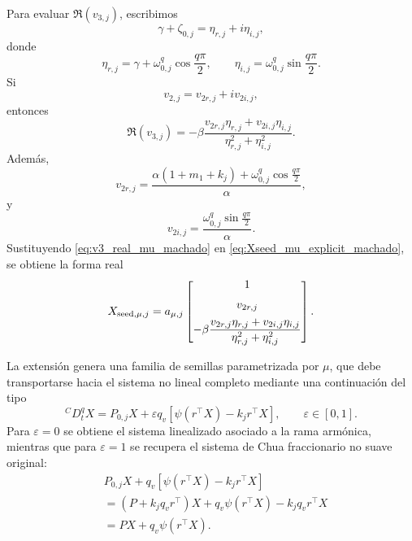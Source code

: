 \documentclass[journal]{IEEEtran}
\begin{document}
Para evaluar \(\Re(v_{3,j})\), escribimos
\begin{equation}
\label{eq:eta_mu_machado}
\gamma+\zeta_{0,j}
=
\eta_{r,j}+i\eta_{i,j},
\end{equation}
donde
\begin{equation}
\eta_{r,j}
=
\gamma+\omega_{0,j}^q\cos\frac{q\pi}{2},
\qquad
\eta_{i,j}
=
\omega_{0,j}^q\sin\frac{q\pi}{2}.
\end{equation}
Si
\[
v_{2,j}=v_{2r,j}+iv_{2i,j},
\]
entonces
\begin{equation}
\label{eq:v3_real_mu_machado}
\Re(v_{3,j})
=
-\beta
\frac{
v_{2r,j}\eta_{r,j}+v_{2i,j}\eta_{i,j}
}{
\eta_{r,j}^2+\eta_{i,j}^2
}.
\end{equation}
Además,
\begin{equation}
\label{eq:v2r_mu_machado}
v_{2r,j}
=
\frac{
\alpha(1+m_1+k_j)+
\omega_{0,j}^q\cos\frac{q\pi}{2}
}{\alpha},
\end{equation}
y
\begin{equation}
\label{eq:v2i_mu_machado}
v_{2i,j}
=
\frac{
\omega_{0,j}^q\sin\frac{q\pi}{2}
}{\alpha}.
\end{equation}
Sustituyendo \eqref{eq:v3_real_mu_machado} en
\eqref{eq:Xseed_mu_explicit_machado}, se obtiene la forma real
\begin{equation}
\label{eq:Xseed_mu_final_machado}
X_{{\rm seed},\mu,j}
=
a_{\mu,j}
\begin{bmatrix}
1\\[2mm]
v_{2r,j}\\[2mm]
-\beta
\dfrac{
v_{2r,j}\eta_{r,j}+v_{2i,j}\eta_{i,j}
}{
\eta_{r,j}^2+\eta_{i,j}^2
}
\end{bmatrix}.
\end{equation}


La extensión genera una
familia de semillas parametrizada por \(\mu\), que debe transportarse hacia
el sistema no lineal completo mediante una continuación del tipo
\begin{equation}
\label{eq:continuation_mu_machado}
{}^CD_t^qX
=
P_{0,j}X
+
\varepsilon q_v
\left[
\psi(r^\top X)-k_jr^\top X
\right],
\qquad
\varepsilon\in[0,1].
\end{equation}
Para \(\varepsilon=0\) se obtiene el sistema linealizado asociado a la rama
armónica, mientras que para \(\varepsilon=1\) se recupera el sistema de Chua
fraccionario no suave original:
\begin{align}
&P_{0,j}X
+
q_v\left[\psi(r^\top X)-k_jr^\top X\right]
\nonumber\\
&=
\left(P+k_jq_vr^\top\right)X
+q_v\psi(r^\top X)
-
k_jq_vr^\top X
\nonumber\\
&=
PX+q_v\psi(r^\top X).
\end{align}
\end{document}
